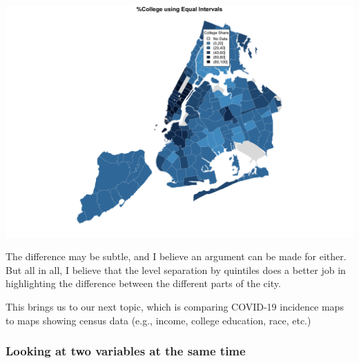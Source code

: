 \documentclass[
  openany]{book}
\newenvironment{Shaded}{\begin{snugshade}}{\end{snugshade}}
\newcommand{\AttributeTok}[1]{\textcolor[rgb]{0.77,0.63,0.00}{#1}}
\newcommand{\DecValTok}[1]{\textcolor[rgb]{0.00,0.00,0.81}{#1}}
\newcommand{\FloatTok}[1]{\textcolor[rgb]{0.00,0.00,0.81}{#1}}
\newcommand{\FunctionTok}[1]{\textcolor[rgb]{0.00,0.00,0.00}{#1}}
\newcommand{\NormalTok}[1]{#1}
\newcommand{\SpecialCharTok}[1]{\textcolor[rgb]{0.00,0.00,0.00}{#1}}
\newcommand{\StringTok}[1]{\textcolor[rgb]{0.31,0.60,0.02}{#1}}
\begin{document}
\begin{Shaded}
\end{Shaded}

\begin{center}\includegraphics[width=0.9\linewidth]{carpedatum_files/figure-html/unnamed-chunk-93-2} \end{center}

The difference may be subtle, and I believe an argument can be made for either. But all in all, I believe that the level separation by quintiles does a better job in highlighting the difference between the different parts of the city.

This brings us to our next topic, which is comparing COVID-19 incidence maps to maps showing census data (e.g., income, college education, race, etc.)

\hypertarget{looking-at-two-variables-at-the-same-time}{%
\subsubsection*{Looking at two variables at the same time}\label{looking-at-two-variables-at-the-same-time}}
\end{document}
